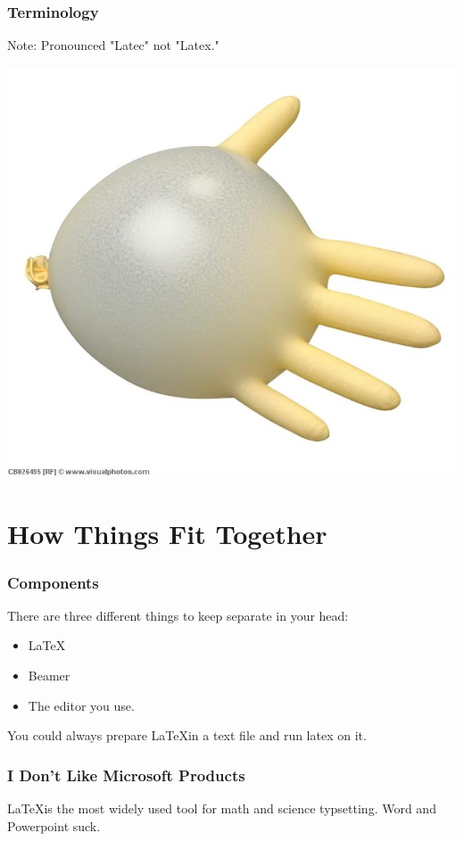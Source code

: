 \documentclass{beamer}
\begin{document}
\begin{frame}
\frametitle{Terminology}
Note: Pronounced "Latec" not "Latex." 

\begin{center}
\includegraphics[scale=.4]{gloves.jpg}
\end{center}
\end{frame}

\section{How Things Fit Together}
\begin{frame}
\frametitle{Components}
There are three different things to keep separate in your head:
\begin{itemize}
\item<1> \LaTeX
\item<2> Beamer
\item<3> The editor you use.
\end{itemize}
You could always prepare \LaTeX in a text file and run latex on it.
\end{frame}

\begin{frame}
\frametitle{I Don't Like Microsoft Products}
\LaTeX is the most widely used tool for math and science typsetting.
\pause
\vspace{20mm}
Word and Powerpoint suck. 
\pause
\end{frame}
\end{document}

